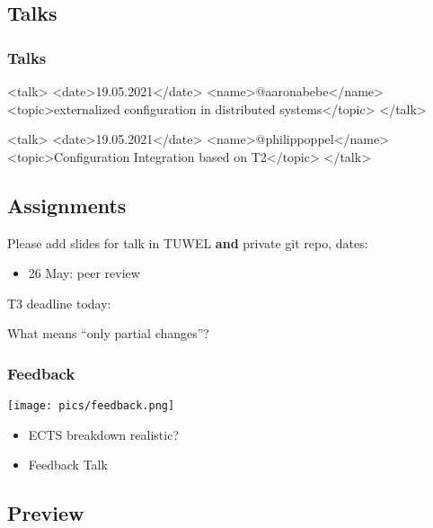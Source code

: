 \subsection{Talks}

\begin{frame}[fragile]
	\frametitle{Talks}

	\begin{code}[language=xml]
  <talk>
    <date>19.05.2021</date>
    <name>@aaronabebe</name>
    <topic>externalized configuration in distributed systems</topic>
  </talk>

  <talk>
    <date>19.05.2021</date>
    <name>@philippoppel</name>
    <topic>Configuration Integration based on T2</topic>
  </talk>
	\end{code}
\end{frame}

\subsection{Assignments}

\begin{assignment}
	Please add slides for talk in TUWEL \textbf{and} private git repo, dates:

	\begin{itemize}[<+-| alert@+>]
	\item 26 May: peer review 
	\end{itemize}
\end{assignment}

\begin{assignment}
	T3 deadline today:

	What means ``only partial changes''?
\end{assignment}

\begin{frame}
	\frametitle{Feedback}
	\hfill \texttt{[image: pics/feedback.png]}
	\vspace{-1cm}
	\begin{itemize}
		\item ECTS breakdown realistic?
		\item Feedback Talk
	\end{itemize}
\end{frame}

\subsection{Preview}

